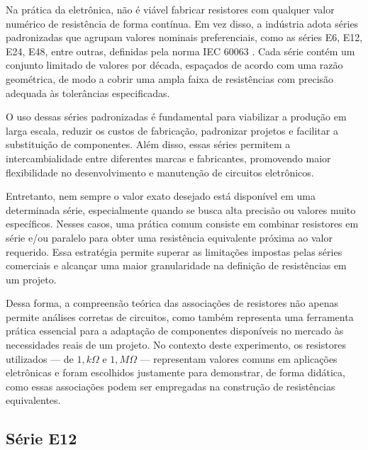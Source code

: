 \documentclass[conference]{IEEEtran}
\begin{document}

Na prática da eletrônica, não é viável fabricar resistores com qualquer valor numérico de resistência de forma contínua. Em vez disso, a indústria adota séries padronizadas que agrupam valores nominais preferenciais, como as séries E6, E12, E24, E48, entre outras, definidas pela norma IEC 60063 \cite{iec60063}. Cada série contém um conjunto limitado de valores por década, espaçados de acordo com uma razão geométrica, de modo a cobrir uma ampla faixa de resistências com precisão adequada às tolerâncias especificadas.

O uso dessas séries padronizadas é fundamental para viabilizar a produção em larga escala, reduzir os custos de fabricação, padronizar projetos e facilitar a substituição de componentes. Além disso, essas séries permitem a intercambialidade entre diferentes marcas e fabricantes, promovendo maior flexibilidade no desenvolvimento e manutenção de circuitos eletrônicos.

Entretanto, nem sempre o valor exato desejado está disponível em uma determinada série, especialmente quando se busca alta precisão ou valores muito específicos. Nesses casos, uma prática comum consiste em combinar resistores em série e/ou paralelo para obter uma resistência equivalente próxima ao valor requerido. Essa estratégia permite superar as limitações impostas pelas séries comerciais e alcançar uma maior granularidade na definição de resistências em um projeto.

Dessa forma, a compreensão teórica das associações de resistores não apenas permite análises corretas de circuitos, como também representa uma ferramenta prática essencial para a adaptação de componentes disponíveis no mercado às necessidades reais de um projeto. No contexto deste experimento, os resistores utilizados — de $1,k\Omega$ e $1,M\Omega$ — representam valores comuns em aplicações eletrônicas e foram escolhidos justamente para demonstrar, de forma didática, como essas associações podem ser empregadas na construção de resistências equivalentes.

\subsection{Série E12}
\end{document}
